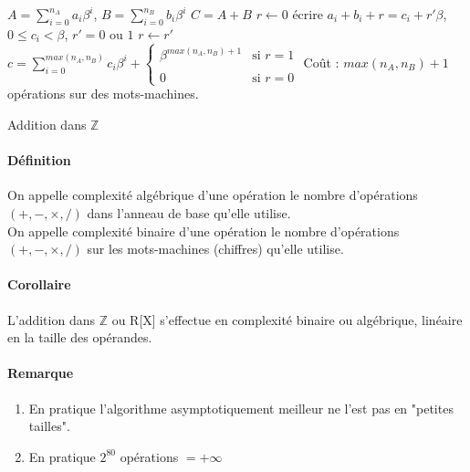 \documentclass[12pt,a4paper]{report}
\begin{document}
\begin{algorithm}[h!]

\begin{algorithmic}
\REQUIRE $\displaystyle A=\sum_{i=0}^{n_A} a_i \beta^i$, $B = \displaystyle \sum_{i=0}^{n_B} b_i \beta^i$
\ENSURE $ C=A+B$
\STATE $r\leftarrow 0$
\STATE écrire $a_i + b_i + r = c_i + r'\beta$,  $ 0 \leqslant c_i < \beta$, $ r' = 0 $ ou $ 1$ 
\STATE $ r \leftarrow r' $
\ENDFOR
\RETURN $c=\displaystyle \sum_{i=0}^{max(n_A,n_B)}c_i\beta^i + \left\{
	\begin{array}{ll}
        \displaystyle  \beta^{max(n_A,n_B)+1} & \mbox{si } r=1\\
       \\
        \displaystyle 0 & \mbox{si } r=0
    \end{array}
\right.$
\STATE Coût : $max(n_A,n_B)+1$ opérations sur des mots-machines.
\end{algorithmic}
\caption{Addition dans $\mathbb{Z}$}
\end{algorithm}

\paragraph{Définition\\}
On appelle complexité algébrique d'une opération le nombre d'opérations $(+,-,\times,/)$ dans l'anneau de base qu'elle utilise.\\
On appelle complexité binaire d'une opération le nombre d'opérations $(+,-,\times,/)$ sur les mots-machines (chiffres) qu'elle utilise.
\paragraph{Corollaire\\}
L'addition dans $\mathbb{Z}$ ou R[X] s'effectue en complexité binaire ou algébrique, linéaire en la taille des opérandes.
\paragraph{Remarque\\}
\begin{enumerate}
\item En pratique l'algorithme asymptotiquement meilleur ne l'est pas en "petites tailles".
\item En pratique $2^{80}$ opérations $ = +\infty$
\end{enumerate}
\end{document}
